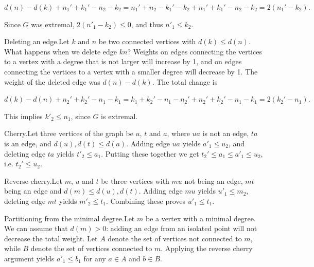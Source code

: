 \documentclass{article}
\begin{document}
\(\displaystyle d(n)-d(k) + n_1'+ k_1' - n_2 - k_2 = n_1' + n_2 - k_1' - k_2 + n_1'+ k_1' - n_2 - k_2 = 2(n_1' - k_2).\)

Since \(\displaystyle G\) was extremal, \(\displaystyle 2(n'_1-k_2)\le 0\), and thus \(\displaystyle n'_1\le k_2\).

Deleting an edge.Let \(\displaystyle k\) and \(\displaystyle n\) be two connected vertices with \(\displaystyle d(k)\le d(n)\). What happens when we delete edge \(\displaystyle kn\)? Weights on edges connecting the vertices to a vertex with a degree that is not larger will increase by 1, and on edges connecting the vertices to a vertex with a smaller degree will decrease by 1. The weight of the deleted edge was \(\displaystyle d(n)-d(k)\). The total change is

\(\displaystyle d(k) - d(n) + n_2' + k_2' - n_1 - k_1 = k_1 + k_2' - n_1 - n_2' + n_2'+ k_2' - n_1 - k_1 = 2(k_2' - n_1).\)

This implies \(\displaystyle k'_2\le n_1\), since \(\displaystyle G\) is extremal.

Cherry.Let three vertices of the graph be \(\displaystyle u\), \(\displaystyle t\) and \(\displaystyle a\), where \(\displaystyle ua\) is not an edge, \(\displaystyle ta\) is an edge, and \(\displaystyle d(u),d(t)\le d(a)\). Adding edge \(\displaystyle ua\) yields \(\displaystyle a'_1\le u_2\), and deleting edge \(\displaystyle ta\) yields \(\displaystyle t'_2\le a_1\). Putting these together we get \(\displaystyle t_2'\le a_1\le a'_1\le u_2\), i.e. \(\displaystyle t_2'\le u_2\).

Reverse cherry.Let \(\displaystyle m\), \(\displaystyle u\) and \(\displaystyle t\) be three vertices with \(\displaystyle mu\) not being an edge, \(\displaystyle mt\) being an edge and \(\displaystyle d(m)\le d(u),d(t)\). Adding edge \(\displaystyle mu\) yields \(\displaystyle u'_1\le m_2\), deleting edge \(\displaystyle mt\) yields \(\displaystyle m'_2 \le t_1\). Combining these proves \(\displaystyle u'_1\le t_1\).

Partitioning from the minimal degree.Let \(\displaystyle m\) be a vertex with a minimal degree. We can assume that \(\displaystyle d(m)>0\): adding an edge from an isolated point will not decrease the total weight. Let \(\displaystyle A\) denote the set of vertices not connected to \(\displaystyle m\), while \(\displaystyle B\) denote the set of vertices connected to \(\displaystyle m\). Applying the reverse cherry argument yields \(\displaystyle a'_1\le b_1\) for any \(\displaystyle a\in A\) and \(\displaystyle b\in B\).
\end{document}
